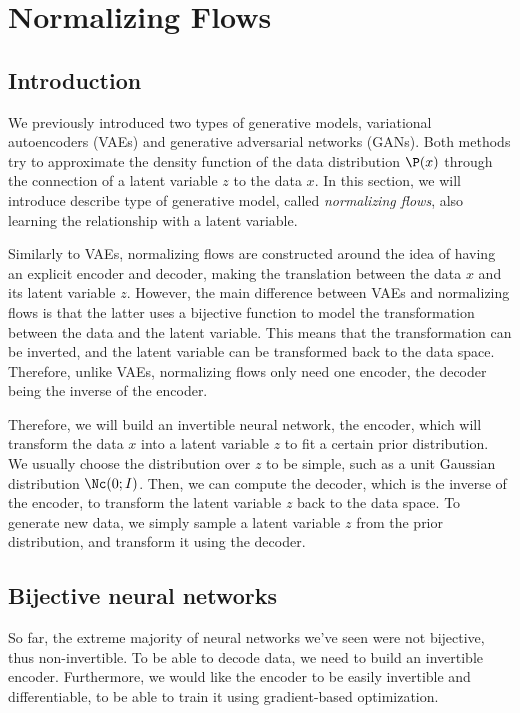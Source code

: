 \section{Normalizing Flows}
\subsection{Introduction}
We previously introduced two types of generative models, variational autoencoders (VAEs) and generative adversarial networks (GANs). Both methods try to approximate the density function of the data distribution $\P(x)$ through the connection of a latent variable $z$ to the data $x$. In this section, we will introduce describe type of generative model, called \emph{normalizing flows}, also learning the relationship with a latent variable. 

Similarly to VAEs, normalizing flows are constructed around the idea of having an explicit encoder and decoder, making the translation between the data $x$ and its latent variable $z$. However, the main difference between VAEs and normalizing flows is that the latter uses a bijective function to model the transformation between the data and the latent variable. This means that the transformation can be inverted, and the latent variable can be transformed back to the data space. Therefore, unlike VAEs, normalizing flows only need one encoder, the decoder being the inverse of the encoder.

Therefore, we will build an invertible neural network, the encoder, which will transform the data $x$ into a latent variable $z$ to fit a certain prior distribution. We usually choose the distribution over $z$ to be simple, such as a unit Gaussian distribution $\Nc(0; I)$. Then, we can compute the decoder, which is the inverse of the encoder, to transform the latent variable $z$ back to the data space. To generate new data, we simply sample a latent variable $z$ from the prior distribution, and transform it using the decoder.

\subsection{Bijective neural networks}
So far, the extreme majority of neural networks we've seen were not bijective, thus non-invertible. To be able to decode data, we need to build an invertible encoder. Furthermore, we would like the encoder to be easily invertible and differentiable, to be able to train it using gradient-based optimization.

